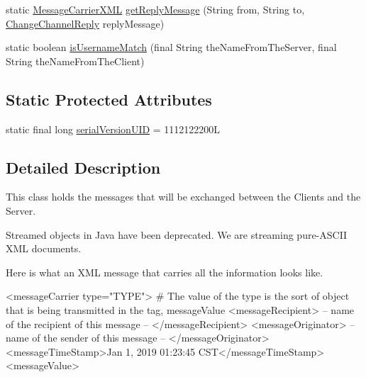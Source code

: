 \begin{DoxyCompactItemize}
\item 
static \hyperlink{classgov_1_1fnal_1_1ppd_1_1dd_1_1xml_1_1MessageCarrierXML}{Message\-Carrier\-X\-M\-L} \hyperlink{classgov_1_1fnal_1_1ppd_1_1dd_1_1xml_1_1MessageCarrierXML_ad716b3dd6f81ec1693e0c2b9209b3b83}{get\-Reply\-Message} (String from, String to, \hyperlink{classgov_1_1fnal_1_1ppd_1_1dd_1_1xml_1_1messages_1_1ChangeChannelReply}{Change\-Channel\-Reply} reply\-Message)
\item 
static boolean \hyperlink{classgov_1_1fnal_1_1ppd_1_1dd_1_1xml_1_1MessageCarrierXML_a04d65b843d37b0e9f2e8026ec00b95ff}{is\-Username\-Match} (final String the\-Name\-From\-The\-Server, final String the\-Name\-From\-The\-Client)
\end{DoxyCompactItemize}
\subsection*{Static Protected Attributes}
\begin{DoxyCompactItemize}
\item 
static final long \hyperlink{classgov_1_1fnal_1_1ppd_1_1dd_1_1xml_1_1MessageCarrierXML_addbf53e6678de784e9f2f7a4804c48cf}{serial\-Version\-U\-I\-D} = 1112122200\-L
\end{DoxyCompactItemize}


\subsection{Detailed Description}
This class holds the messages that will be exchanged between the Clients and the Server.

Streamed objects in Java have been deprecated. We are streaming pure-\/\-A\-S\-C\-I\-I X\-M\-L documents.

Here is what an X\-M\-L message that carries all the information looks like.


\begin{DoxyPre}\end{DoxyPre}



\begin{DoxyPre}<messageCarrier type="TYPE"> \# The value of the type is the sort of object that is being transmitted in the tag, messageValue
  <messageRecipient> -- name of the recipient of this message -- </messageRecipient> 
  <messageOriginator> -- name of the sender of this message -- </messageOriginator> 
    <messageTimeStamp>Jan  1, 2019 01:23:45 CST</messageTimeStamp>
  <messageValue>\end{DoxyPre}



